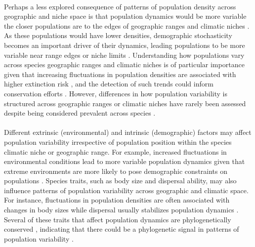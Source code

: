 \paragraph*{}
Perhaps a less explored consequence of patterns of population density across geographic and niche space is that population dynamics would be more variable the closer populations are to the edges of geographic ranges and climatic niches \parencite{lawton1993,sagarin2006, pironon2017}. As these populations would have lower densities, demographic stochasticity becomes an important driver of their dynamics, leading populations to be more variable near range edges or niche limits \parencite{melbourne2008, pironon2017, tencaten2025}. Understanding how populations vary across species geographic ranges and climatic niches is of particular importance given that increasing fluctuations in population densities are associated with higher extinction risk \parencite{bjornstad2001, ovaskainen2010}, and the detection of such trends could inform conservation efforts \parencite{burgess2020}. However, differences in how population variability is structured across geographic ranges or climatic niches have rarely been assessed \parencite{sagarin2006,pironon2017, tencaten2025} despite being considered prevalent across species \parencite{vucetich2003}.
 
\paragraph*{}
Different extrinsic (environmental) and intrinsic (demographic) factors may affect population variability irrespective of population position within the species climatic niche or geographic range. For example, increased fluctuations in environmental conditions lead to more variable population dynamics given that extreme environments are more likely to pose demographic constraints on populations \parencite{bjornstad2001, boyce2006}. Species traits, such as body size and dispersal ability, may also influence patterns of population variability across geographic and climatic space. For instance, fluctuations in population densities are often associated with changes in body sizes \parencite{chitty1952,van2017} while dispersal usually stabilizes population dynamics \parencite{doebeli1995,abbott2011}. Several of these traits that affect population dynamics are phylogenetically conserved \parencite{wiens2010, park2015}, indicating that there could be a phylogenetic signal in patterns of population variability \parencite{dallas2024}.
 
